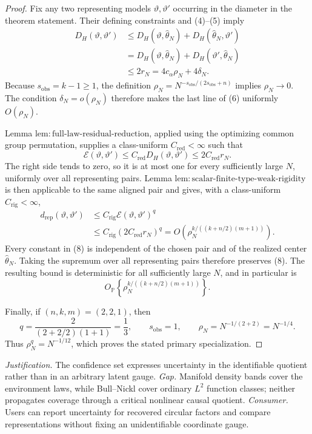 \documentclass{article}
\begin{document}
\begin{proof}
Fix any two representing models \(\vartheta,\vartheta'\) occurring in the diameter in the theorem statement.  Their defining constraints and (4)--(5) imply
\[
\begin{aligned}
 D_H(\vartheta,\vartheta')
 &\leq D_H(\vartheta,\widehat\theta_N)
       +D_H(\widehat\theta_N,\vartheta')\\
 &=D_H(\vartheta,\widehat\theta_N)
       +D_H(\vartheta',\widehat\theta_N)\\
 &\leq2r_N=4c_\alpha\rho_N+4\delta_N.
\end{aligned}
\tag{6}
\]
Because \(s_{\mathrm{obs}}=k-1\geq1\), the definition
\(
 \rho_N=N^{-s_{\mathrm{obs}}/(2s_{\mathrm{obs}}+n)}
\)
implies \(\rho_N\to0\).  The condition \(\delta_N=o(\rho_N)\) therefore makes the last line of (6) uniformly \(O(\rho_N)\).

Lemma \(\mathrm{lem:full\text{-}law\text{-}residual\text{-}reduction}\), applied using the optimizing common group permutation, supplies a class-uniform \(C_{\mathrm{red}}<\infty\) such that
\[
 \mathcal E(\vartheta,\vartheta')
 \leq C_{\mathrm{red}}D_H(\vartheta,\vartheta')
 \leq2C_{\mathrm{red}}r_N.
\tag{7}
\]
The right side tends to zero, so it is at most one for every sufficiently large \(N\), uniformly over all representing pairs.  Lemma \(\mathrm{lem:scalar\text{-}finite\text{-}type\text{-}weak\text{-}rigidity}\) is then applicable to the same aligned pair and gives, with a class-uniform \(C_{\mathrm{rig}}<\infty\),
\[
\begin{aligned}
 d_{\mathrm{rep}}(\vartheta,\vartheta')
 &\leq C_{\mathrm{rig}}\mathcal E(\vartheta,\vartheta')^q\\
 &\leq C_{\mathrm{rig}}(2C_{\mathrm{red}}r_N)^q
 =O\!\left(\rho_N^{k/((k+n/2)(m+1))}\right).
\end{aligned}
\tag{8}
\]
Every constant in (8) is independent of the chosen pair and of the realized center \(\widehat\theta_N\).  Taking the supremum over all representing pairs therefore preserves (8).  The resulting bound is deterministic for all sufficiently large \(N\), and in particular is
\[
 O_{\mathbb P}\!\left\{\rho_N^{k/((k+n/2)(m+1))}\right\}.
\]

Finally, if \((n,k,m)=(2,2,1)\), then
\[
 q=\frac{2}{(2+2/2)(1+1)}=\frac13,
 \qquad
 s_{\mathrm{obs}}=1,
 \qquad
 \rho_N=N^{-1/(2+2)}=N^{-1/4}.
\]
Thus \(\rho_N^q=N^{-1/12}\), which proves the stated primary specialization.
\end{proof}
\par\smallskip\noindent \textit{Justification.} The confidence set expresses uncertainty in the identifiable quotient rather than in an arbitrary latent gauge. \textit{Gap.} Manifold density bands cover the environment laws, while Bull--Nickl cover ordinary \(L^2\) function classes; neither propagates coverage through a critical nonlinear causal quotient. \textit{Consumer.} Users can report uncertainty for recovered circular factors and compare representations without fixing an unidentifiable coordinate gauge.
\end{document}
